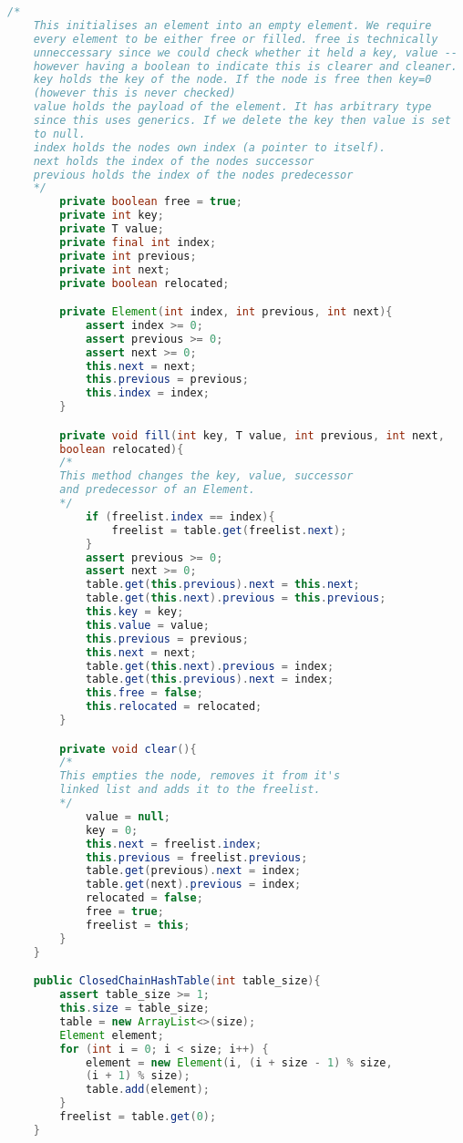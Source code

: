 \documentclass[10pt,\jkfside,a4paper]{article}
\begin{document}
\begin{enumerate}
\begin{enumerate}
\begin{lstlisting}[language=java]
	/*
	This initialises an element into an empty element. We require 
	every element to be either free or filled. free is technically 
	unneccessary since we could check whether it held a key, value -- 
	however having a boolean to indicate this is clearer and cleaner.
	key holds the key of the node. If the node is free then key=0 
	(however this is never checked)
	value holds the payload of the element. It has arbitrary type 
	since this uses generics. If we delete the key then value is set 
	to null.
	index holds the nodes own index (a pointer to itself).
	next holds the index of the nodes successor
	previous holds the index of the nodes predecessor
	*/
        private boolean free = true;
        private int key;
        private T value;
        private final int index;
        private int previous;
        private int next;
        private boolean relocated;

        private Element(int index, int previous, int next){
            assert index >= 0;
            assert previous >= 0;
            assert next >= 0;
            this.next = next;
            this.previous = previous;
            this.index = index;
        }

        private void fill(int key, T value, int previous, int next, 
		boolean relocated){
	    /*
	    This method changes the key, value, successor 
	    and predecessor of an Element.
	    */
            if (freelist.index == index){
                freelist = table.get(freelist.next);
            }
            assert previous >= 0;
            assert next >= 0;
            table.get(this.previous).next = this.next;
            table.get(this.next).previous = this.previous;
            this.key = key;
            this.value = value;
            this.previous = previous;
            this.next = next;
            table.get(this.next).previous = index;
            table.get(this.previous).next = index;
            this.free = false;
            this.relocated = relocated;
        }

        private void clear(){
	    /*
	    This empties the node, removes it from it's 
	    linked list and adds it to the freelist.
	    */
            value = null;
            key = 0;
            this.next = freelist.index;
            this.previous = freelist.previous;
            table.get(previous).next = index;
            table.get(next).previous = index;
            relocated = false;
            free = true;
            freelist = this;
        }
    }

    public ClosedChainHashTable(int table_size){
        assert table_size >= 1;
        this.size = table_size;
        table = new ArrayList<>(size);
        Element element;
        for (int i = 0; i < size; i++) {
            element = new Element(i, (i + size - 1) % size, 
			(i + 1) % size);
            table.add(element);
        }
        freelist = table.get(0);
    }


\end{lstlisting}
\end{enumerate}
\end{enumerate}
\end{document}

